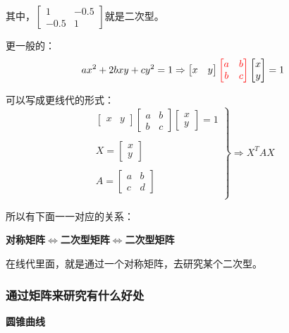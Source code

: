 \documentclass[12pt]{article}
\begin{document}
其中，$\left[\begin{smallmatrix}1&-0.5\\-0.5&1\end{smallmatrix}\right]$就是二次型。

更一般的：
$$
ax^2 + 2bxy + cy^2 = 1\Rightarrow 
\begin{bmatrix}x & y\end{bmatrix}
\textcolor{red}{\begin{bmatrix}a&b\\b&c\end{bmatrix}}
\begin{bmatrix}x \\ y\end{bmatrix} = 1
$$

可以写成更线代的形式：
$$
\left.
\begin{matrix}
\begin{bmatrix}x & y\end{bmatrix}
\begin{bmatrix}a&b\\b&c\end{bmatrix}
\begin{bmatrix}x \\ y\end{bmatrix} = 1 \\
\\
X =  \begin{bmatrix}x \\ y\end{bmatrix}\\
\\
A = \begin{bmatrix}a&b\\c&d\end{bmatrix} \\
\end{matrix}
\right\}
\Rightarrow X^TAX
$$

所以有下面一一对应的关系：
\begin{center}
\textbf{对称矩阵$\Longleftrightarrow$二次型矩阵$\Longleftrightarrow$二次型矩阵}
\end{center}

在线代里面，就是通过一个对称矩阵，去研究某个二次型。

\subsubsection{通过矩阵来研究有什么好处}
\textbf{圆锥曲线}
\end{document}
